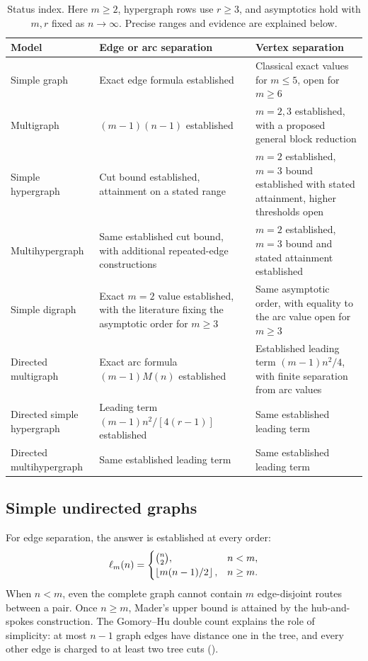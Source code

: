\begin{table}[htbp]
\centering\small
\renewcommand{\arraystretch}{1.2}
\begin{tabularx}{\textwidth}{@{}>{\raggedright\arraybackslash}p{}>{\raggedright\arraybackslash}X>{\raggedright\arraybackslash}X@{}}
\toprule
Model & Edge or arc separation & Vertex separation \\
\midrule
Simple graph & Exact edge formula established & Classical exact values for $m\le5$, open for $m\ge6$ \\
Multigraph & $(m-1)(n-1)$ established & $m=2,3$ established, with a proposed general block reduction \\
Simple hypergraph & Cut bound established, attainment on a stated range & $m=2$ established, $m=3$ bound established with stated attainment, higher thresholds open \\
Multihypergraph & Same established cut bound, with additional repeated-edge constructions & $m=2$ established, $m=3$ bound and stated attainment established \\
Simple digraph & Exact $m=2$ value established, with the literature fixing the asymptotic order for $m\ge3$ & Same asymptotic order, with equality to the arc value open for $m\ge3$ \\
Directed multigraph & Exact arc formula $(m-1)M(n)$ established & Established leading term $(m-1)n^2/4$, with finite separation from arc values \\
Directed simple hypergraph & Leading term $(m-1)n^2/[4(r-1)]$ established & Same established leading term \\
Directed multihypergraph & Same established leading term & Same established leading term \\
\bottomrule
\end{tabularx}
\caption{Status index. Here $m\ge2$, hypergraph rows use $r\ge3$, and
asymptotics hold with $m,r$ fixed as $n\to\infty$. Precise ranges and
evidence are explained below.}
\label{tab:summary}
\end{table}

\subsection{Simple undirected graphs}
\label{sec:status-simple-undirected}

For edge separation, the answer is established at every order:
\[
 \ell_m(n)=
 \begin{cases}
 \binom n2,&n<m,\\
 \left\lfloor m(n-1)/2 \right\rfloor,&n\ge m.
 \end{cases}
\]
When $n<m$, even the complete graph cannot contain $m$ edge-disjoint routes
between a pair. Once $n\ge m$, Mader's upper bound is attained by the
hub-and-spokes construction. The Gomory--Hu double count explains the role
of simplicity: at most $n-1$ graph edges have distance one in the tree, and
every other edge is charged to at least two tree cuts
().

